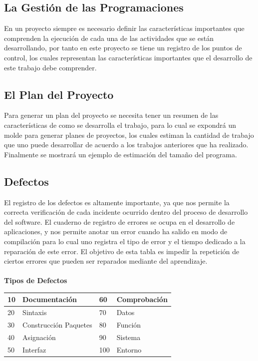 \documentclass[a4paper,12pt,openany,oneside]{book}
\begin{document}
\subsection{La Gestión de las Programaciones}
En un proyecto siempre es necesario definir las características importantes que comprenden la ejecución de cada una de las actividades que se están desarrollando, por tanto en este proyecto se tiene un registro de los puntos de control, los cuales representan las características importantes que el desarrollo de este trabajo debe comprender.
\subsection{El Plan del Proyecto}
Para generar un plan del proyecto se necesita tener un resumen de las características de como se desarrolla el trabajo, para lo cual se expondrá un molde para generar planes de proyectos, los cuales estiman la cantidad de trabajo que uno puede desarrollar de acuerdo a los trabajos anteriores que ha realizado. Finalmente se mostrará un ejemplo de estimación del tamaño del programa.
\subsection{Defectos}
El registro de los defectos es altamente importante, ya que nos permite la correcta verificación de cada incidente ocurrido dentro del proceso de desarrollo del software. El cuaderno de registro de errores se ocupa en el desarrollo de aplicaciones, y nos permite anotar un error cuando ha salido en modo de compilación para lo cual uno registra el tipo de error y el tiempo dedicado a la reparación de este error. El objetivo de esta tabla es impedir la repetición de ciertos errores que pueden ser reparados mediante del aprendizaje.\\
\\
\textbf{Tipos de Defectos}\\
\begin{tabular}{| l | l | l | l |}
\hline
10 & Documentación         & 60 & Comprobación\\
\hline
20 & Sintaxis              & 70 & Datos\\
\hline
30 & Construcción Paquetes & 80 & Función\\
\hline
40 & Asignación            & 90 & Sistema\\
\hline
50 & Interfaz              & 100 & Entorno\\
\hline
\end{tabular}
\end{document}
